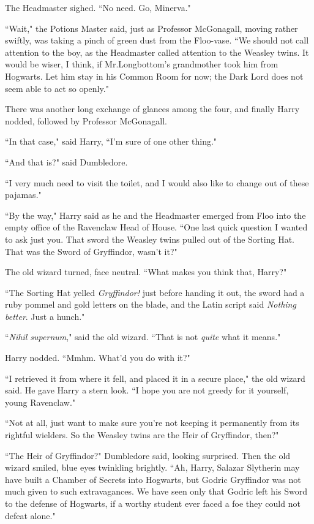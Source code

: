 The Headmaster sighed. ``No need. Go, Minerva."

``Wait," the Potions Master said, just as Professor McGonagall, moving rather swiftly, was taking a pinch of green dust from the Floo-vase. ``We should not call attention to the boy, as the Headmaster called attention to the Weasley twins. It would be wiser, I think, if Mr.\?Longbottom's grandmother took him from Hogwarts. Let him stay in his Common Room for now; the Dark Lord does not seem able to act so openly."

There was another long exchange of glances among the four, and finally Harry nodded, followed by Professor McGonagall.

``In that case," said Harry, ``I'm sure of one other thing."

``And that is?" said Dumbledore.

``I very much need to visit the toilet, and I would also like to change out of these pajamas."

\later

``By the way," Harry said as he and the Headmaster emerged from Floo into the empty office of the Ravenclaw Head of House. ``One last quick question I wanted to ask just you. That sword the Weasley twins pulled out of the Sorting Hat. That was the Sword of Gryffindor, wasn't it?"

The old wizard turned, face neutral. ``What makes you think that, Harry?"

``The Sorting Hat yelled \emph{Gryffindor!} just before handing it out, the sword had a ruby pommel and gold letters on the blade, and the Latin script said \emph{Nothing better}. Just a hunch."

``\emph{Nihil supernum}," said the old wizard. ``That is not \emph{quite} what it means."

Harry nodded. ``Mmhm. What'd you do with it?"

``I retrieved it from where it fell, and placed it in a secure place," the old wizard said. He gave Harry a stern look. ``I hope you are not greedy for it yourself, young Ravenclaw."

``Not at all, just want to make sure you're not keeping it permanently from its rightful wielders. So the Weasley twins are the Heir of Gryffindor, then?"

``The Heir of Gryffindor?" Dumbledore said, looking surprised. Then the old wizard smiled, blue eyes twinkling brightly. ``Ah, Harry, Salazar Slytherin may have built a Chamber of Secrets into Hogwarts, but Godric Gryffindor was not much given to such extravagances. We have seen only that Godric left his Sword to the defense of Hogwarts, if a worthy student ever faced a foe they could not defeat alone."

